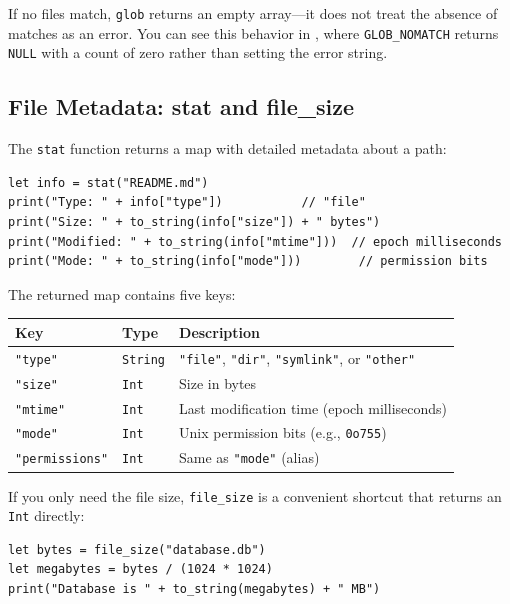 If no files match, \lstinline|glob| returns an empty array---it does not treat
the absence of matches as an error. You can see this behavior in
, where \texttt{GLOB\_NOMATCH} returns \texttt{NULL}
with a count of zero rather than setting the error string.

\subsection{File Metadata: stat and file\_size}\label{sec:stat}


The \lstinline|stat| function returns a map with detailed metadata about a
path:

\begin{lstlisting}[language=Lattice, caption={Inspecting file metadata with stat}]
let info = stat("README.md")
print("Type: " + info["type"])           // "file"
print("Size: " + to_string(info["size"]) + " bytes")
print("Modified: " + to_string(info["mtime"]))  // epoch milliseconds
print("Mode: " + to_string(info["mode"]))        // permission bits
\end{lstlisting}

The returned map contains five keys:

\begin{center}
\begin{tabular}{lll}
\toprule
\textbf{Key} & \textbf{Type} & \textbf{Description} \\
\midrule
\lstinline|"type"| & \lstinline|String| & \texttt{"file"}, \texttt{"dir"}, \texttt{"symlink"}, or \texttt{"other"} \\
\lstinline|"size"| & \lstinline|Int| & Size in bytes \\
\lstinline|"mtime"| & \lstinline|Int| & Last modification time (epoch milliseconds) \\
\lstinline|"mode"| & \lstinline|Int| & Unix permission bits (e.g., \texttt{0o755}) \\
\lstinline|"permissions"| & \lstinline|Int| & Same as \lstinline|"mode"| (alias) \\
\bottomrule
\end{tabular}
\end{center}

If you only need the file size, \lstinline|file_size| is a convenient
shortcut that returns an \lstinline|Int| directly:

\begin{lstlisting}[language=Lattice, caption={Quick file size check}]
let bytes = file_size("database.db")
let megabytes = bytes / (1024 * 1024)
print("Database is " + to_string(megabytes) + " MB")
\end{lstlisting}

